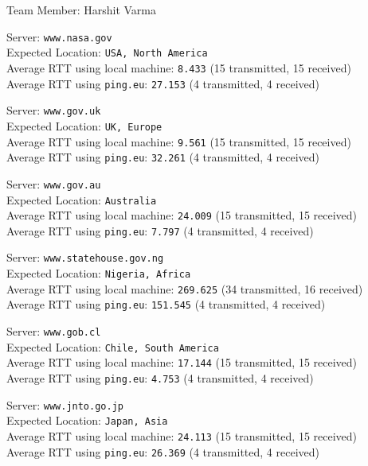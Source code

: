 \documentclass[11pt, fleqn]{article}
\begin{document}
Team Member: Harshit Varma

\hrulefill
\smallskip

Server: \texttt{www.nasa.gov} \\
Expected Location: \texttt{USA, North America}\\
Average RTT using local machine: \texttt{8.433} (15 transmitted, 15 received)\\
Average RTT using \texttt{ping.eu}: \texttt{27.153} (4 transmitted, 4 received)

\hrulefill
\smallskip

Server: \texttt{www.gov.uk}\\
Expected Location: \texttt{UK, Europe}\\
Average RTT using local machine: \texttt{9.561} (15 transmitted, 15 received)\\
Average RTT using \texttt{ping.eu}: \texttt{32.261} (4 transmitted, 4 received)

\hrulefill
\smallskip

Server: \texttt{www.gov.au}\\
Expected Location: \texttt{Australia}\\
Average RTT using local machine: \texttt{24.009} (15 transmitted, 15 received)\\
Average RTT using \texttt{ping.eu}: \texttt{7.797} (4 transmitted, 4 received)

\hrulefill
\smallskip

Server: \texttt{www.statehouse.gov.ng}\\
Expected Location: \texttt{Nigeria, Africa}\\
Average RTT using local machine: \texttt{269.625} (34 transmitted, 16 received)\\
Average RTT using \texttt{ping.eu}: \texttt{151.545} (4 transmitted, 4 received)

\hrulefill
\smallskip

Server: \texttt{www.gob.cl}\\
Expected Location: \texttt{Chile, South America}\\
Average RTT using local machine: \texttt{17.144} (15 transmitted, 15 received)\\
Average RTT using \texttt{ping.eu}: \texttt{4.753} (4 transmitted, 4 received)

\hrulefill
\smallskip

Server: \texttt{www.jnto.go.jp}\\
Expected Location: \texttt{Japan, Asia}\\
Average RTT using local machine: \texttt{24.113} (15 transmitted, 15 received)\\
Average RTT using \texttt{ping.eu}: \texttt{26.369} (4 transmitted, 4 received)
\end{document}
